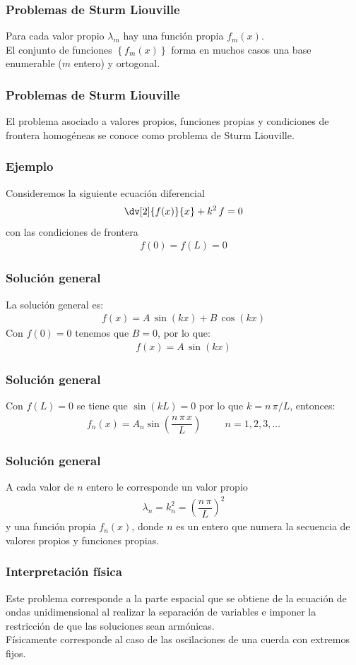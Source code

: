 \begin{frame}
\frametitle{Problemas de Sturm Liouville}
Para cada valor propio $\lambda_{m}$ hay una función propia $f_{m}(x)$.
\\
\bigskip
\pause
El conjunto de funciones $\left\{ f_{m}(x) \right\}$ forma en muchos casos una base enumerable ($m$ entero) y ortogonal.
\end{frame}
\begin{frame}
\frametitle{Problemas de Sturm Liouville}
El problema asociado a valores propios, funciones propias y condiciones de frontera homogéneas se conoce como problema de Sturm Liouville.
\end{frame}
\begin{frame}
\frametitle{Ejemplo}
Consideremos la siguiente ecuación diferencial
\begin{align*}
\dv[2]{f(x)}{x} + k^{2} \, f = 0
\end{align*}
con las condiciones de frontera
\begin{align*}
f(0) = f(L) = 0
\end{align*}
\end{frame}
\begin{frame}
\frametitle{Solución general}
La solución general es:
\begin{align*}
f(x) = A \, \sin (kx) + B \, \cos (kx)
\end{align*}
\pause
Con $f(0) = 0$ tenemos que $B = 0$, por lo que:
\begin{align*}
f(x) = A \, \sin (kx)
\end{align*}
\end{frame}
\begin{frame}
\frametitle{Solución general}
Con $f(L) = 0$ se tiene que $\sin (kL) = 0$ por lo que $k = n \, \pi / L$, entonces:
\begin{align*}
f_{n} (x) = A_{n} \sin \left( \dfrac{n \, \pi \, x}{L} \right) \hspace{1cm} n = 1, 2, 3, \ldots
\end{align*}
\end{frame}
\begin{frame}
\frametitle{Solución general}
A cada valor de $n$ entero le corresponde un valor propio 
\begin{align*}
\lambda_{n} = k_{n}^{2} = \left( \dfrac{n \, \pi}{L} \right)^{2}
\end{align*}
 y una función propia $f_{n}(x)$, donde $n$ es un entero que numera la secuencia de valores propios y funciones propias.
\end{frame}
\begin{frame}
\frametitle{Interpretación física}
Este problema corresponde a la parte espacial que se obtiene de la ecuación de ondas unidimensional al realizar la separación de variables e imponer la restricción de que las soluciones sean armónicas.
\\
\bigskip
\pause
Físicamente corresponde al caso de las oscilaciones de una cuerda con extremos fijos.
\end{frame}
